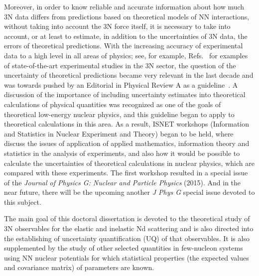 Moreover, in order to know reliable and accurate information about how much 3N 
data differs from predictions based on theoretical models of NN interactions, 
without taking into account the 3N force itself, it is necessary to take into 
account, or at least to estimate, in addition to the uncertainties of 3N data, 
the errors of theoretical predictions. With the increasing accuracy of 
experimental data to a high level in all areas of physics; see, for example, 
Refs.~\cite{Howell1994, Kistryn2005, Przewoski2006, Weisel2014, Sekiguchi2017} 
for examples of state-of-the-art experimental studies in the 3N sector, the 
question of the uncertainty of theoretical predictions became very relevant in 
the last decade and was towards pushed by an Editorial in Physical Review A as 
a guideline~\cite{edit2011}. A discussion of the importance of including 
uncertainty estimates into theoretical calculations of physical quantities was 
recognized as one of the goals of theoretical low-energy nuclear physics, and 
this guideline began to apply to theoretical calculations in this area. As a 
result, ISNET workshops (Information and Statistics in Nuclear Experiment and 
Theory) began to be held, where discuss the issues of application of applied 
mathematics, information theory and statistics in the analysis of experiments, 
and also how it would be possible to calculate the uncertainties of theoretical 
calculations in nuclear physics, which are compared with these experiments. The 
first workshop resulted in a special issue of the \textit{Journal of Physics G: 
Nuclear and Particle Physics} (2015). And in the near future, there will be the 
upcoming another \textit{J Phys G} special issue devoted to this subject.

The main goal of this doctoral dissertation is devoted to the theoretical study 
of 3N observables for the elastic and inelastic Nd scattering and is also 
directed into the establishing of uncertainty quantification (UQ) of that 
observables. It is also supplemented by the study of other selected quantities 
in few-nucleon systems using NN nuclear potentials for which statistical 
properties (the expected values and covariance matrix) of parameters are known.

